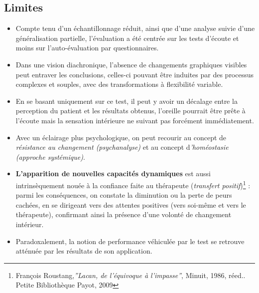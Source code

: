 \subsection{Limites}


  \begin{itemize}
  
\item Compte tenu  d'un échantillonnage réduit, ainsi que d'une analyse
  suivie d'une généralisation partielle, l'évaluation a été centrée sur les
  tests d'écoute et moins sur
  l'auto-évaluation par questionnaires.

\item   Dans une vision diachronique, l'absence de changements graphiques
 visibles 
 peut  entraver les conclusions, celles-ci pouvant être 
 induites par des processus complexes et souples, avec des
 transformations à flexibilité variable.
\item En se basant uniquement sur ce test, il peut y avoir un décalage entre
la perception du patient et les résultats obtenus, l'oreille pourrait
être prête à l'écoute mais la sensation intérieure ne suivant pas
forcément immédiatement.


\item Avec un éclairage plus psychologique, on peut recourir au concept de
\textit{résistance au changement (psychanalyse)} et au concept
d\textit{'homéostasie (approche systémique)}.

\item \textbf{L'apparition de nouvelles
capacités  dynamiques }est aussi intrinsèquement nouée à la confiance
faite au thérapeute (\textit{transfert positif})\footnote{François
Roustang,\textit{''Lacan, de l'équivoque à l'impasse''}, Minuit, 1986,
réed.. Petite Bibliothèque Payot, 2009} : parmi les conséquences, on constate la
diminution ou la perte de peurs cachées,  en se dirigeant vers des
attentes positives (vers soi-même et vers le thérapeute), confirmant ainsi la
présence d'une volonté de changement intérieur.

\item Paradoxalement, la notion de performance véhiculée par le test se
  retrouve atténuée par les résultats de son application.
  \end{itemize}






